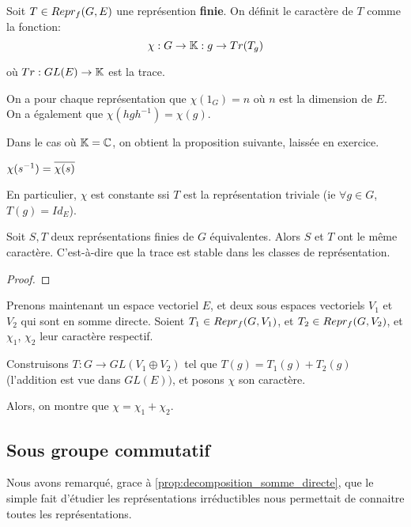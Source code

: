 \begin{definition}
	Soit $T \in Repr_{f}(G, E)$ une représention \textbf{finie}.
	On définit le caractère de $T$ comme la fonction:
	\begin{equation}
		\chi : G \rightarrow \mathbb{K} : g \rightarrow Tr(T_{g})
	\end{equation}

	où $Tr : GL(E) \rightarrow \mathbb{K}$ est la trace.
\end{definition}

On a pour chaque représentation que $\chi(1_{G}) = n$ où $n$ est la dimension de
$E$.
On a également que $\chi(h g h^{-1}) = \chi(g)$.

Dans le cas où $\mathbb{K} = \mathbb{C}$, on obtient la proposition suivante, laissée en exercice.

\begin{proposition}
	$\chi(s^{-1}) = \overline{\chi(s)}$
\end{proposition}

En particulier, $\chi$ est constante ssi $T$ est la représentation triviale (ie $\forall g \in G$, $T(g) =
Id_{E}$).

\begin{proposition}
	Soit $S, T$ deux représentations finies de $G$ équivalentes. Alors $S$ et
	$T$ ont le même caractère. C'est-à-dire que la trace est stable dans les
	classes de représentation.
\end{proposition}

\ifdefined\outputproof
\begin{proof}

\end{proof}
\fi

Prenons maintenant un espace vectoriel $E$, et deux sous espaces vectoriels
$V_{1}$ et $V_{2}$ qui sont en somme directe.
Soient $T_{1} \in Repr_{f}(G, V_{1})$, et $T_{2} \in Repr_{f}(G, V_{2})$, et
$\chi_{1}$, $\chi_{2}$ leur caractère respectif.

Construisons $T : G \rightarrow GL(V_{1} \oplus V_{2})$ tel que $T(g) = T_{1}(g)
+ T_{2}(g)$ (l'addition est vue dans $GL(E))$, et posons $\chi$ son caractère.

Alors, on montre que $\chi = \chi_{1} + \chi_{2}$.


\subsection{Sous groupe commutatif}

Nous avons remarqué, grace à \ref{prop:decomposition_somme_directe}, que le
simple fait d'étudier les représentations irréductibles nous permettait de
connaitre toutes les représentations.

